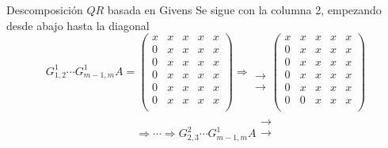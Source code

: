 \documentclass{beamer}
\begin{document}
  \begin{frame}{Descomposici\'on $QR$ basada en Givens}
  Se sigue con la columna 2, empezando desde abajo hasta la diagonal
  \footnotesize
  $$
  G^1_{1,2}\cdots G^1_{m-1,m}A =\left(\begin{array}{ccccc}
           x & x & x & x & x\\
           0 & x & x & x & x\\
           0 & x & x & x & x\\
           0 & x & x & x & x\\
           0 & x & x & x & x\\
           0 & x & x & x & x\\
          \end{array}\right)\Rightarrow\begin{array}{r}
                                               \\
                                               \\
                                               \\
                                               \\
                                               \to\\
                                               \to
                                              \end{array}\left(\begin{array}{ccccc}
           x & x & x & x & x\\
           0 & x & x & x & x\\
           0 & x & x & x & x\\
           0 & x & x & x & x\\
           0 & x & x & x & x\\
           0 & 0 & x & x & x\\
          \end{array}\right)
  $$ 
  $$
  \Rightarrow \cdots \Rightarrow G^2_{2,3}\cdots G^1_{m-1,m}A\begin{array}{r}
                                               \\
                                               \to\\
                                               \to\\
                                               \\
                                               \\
                                               \\

\end{array}$$
\end{frame}
\end{document}
